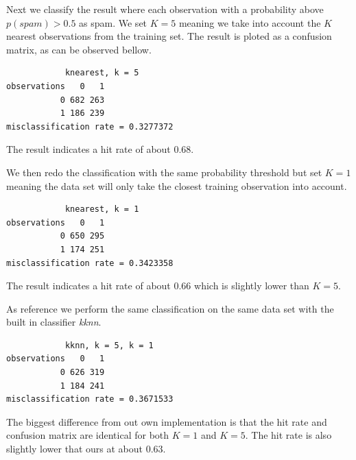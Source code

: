 \documentclass[a4paper,12pt]{article}
\begin{document}
Next we classify the result where each observation with a probability above \( p(spam) > 0.5\) as spam. We set \(K = 5\) meaning we take into account the \(K\) nearest observations from the training set. The result is ploted as a confusion matrix, as can be observed bellow. 
\begin{verbatim}
            knearest, k = 5
observations   0   1
           0 682 263
           1 186 239
misclassification rate = 0.3277372
\end{verbatim}
The result indicates a hit rate of about \(0.68\).

We then redo the classification with the same probability threshold but set \(K = 1\) meaning the data set will only take the closest training observation into account.
\begin{verbatim}
            knearest, k = 1
observations   0   1
           0 650 295
           1 174 251
misclassification rate = 0.3423358
\end{verbatim}
The result indicates a hit rate of about \(0.66\) which is slightly lower than \( K = 5\).

As reference we perform the same classification on the same data set with the built in classifier \textit{kknn}. 
\begin{verbatim}
            kknn, k = 5, k = 1
observations   0   1
           0 626 319
           1 184 241
misclassification rate = 0.3671533
\end{verbatim}
The biggest difference from out own implementation is that the hit rate and confusion matrix are identical for both \(K = 1\) and \(K = 5\). The hit rate is also slightly lower that ours at about \( 0.63\).
\end{document}
